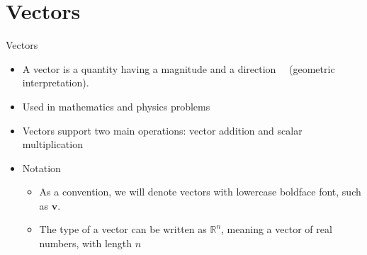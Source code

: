 \documentclass[aspectratio=169,xcolor=dvipsnames]{beamer}
\begin{document}



\section{Vectors}

\begin{frame}{Vectors}
      \begin{itemize}
      \item A vector is a quantity having a magnitude and a direction~{\color{red}~\cite{Wikipedia_Vectors_2024}} (geometric interpretation).
      \item Used in mathematics and physics problems
      \item Vectors support two main operations: vector addition and scalar multiplication
      \item Notation
            \begin{itemize}
                  \item As a convention, we will denote vectors with lowercase boldface
                        font, such as $\mathbf{v}$.
                  \item The type of a vector can be written as $\mathbb{R}^n$, meaning
                        a vector of real numbers, with length $n$
            \end{itemize}
      \end{itemize}
\end{frame}
\end{document}
